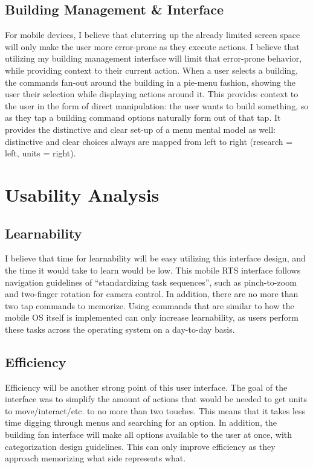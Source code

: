 \documentclass[11pt]{article}
\begin{document}
	\subsection{Building Management \& Interface}
	For mobile devices, I believe that cluterring up the already limited screen space will only make the user more error-prone as they execute actions. I believe that utilizing my building management interface will limit that error-prone behavior, while providing context to their current action. When a user selects a building, the commands fan-out around the building in a pie-menu fashion, showing the user their selection while displaying actions around it. This provides context to the user in the form of direct manipulation: the user wants to build something, so as they tap a building command options naturally form out of that tap. It provides the distinctive and clear set-up of a menu mental model as well: distinctive and clear choices always are mapped from left to right (research = left, units = right). 
\section{Usability Analysis}
	\subsection{Learnability}
	I believe that time for learnability will be easy utilizing this interface design, and the time it would take to learn would be low. This mobile RTS interface follows navigation guidelines of ``standardizing task sequences'', such as pinch-to-zoom and two-finger rotation for camera control. In addition, there are no more than two tap commands to memorize. Using commands that are similar to how the mobile OS itself is implemented can only increase learnability, as users perform these tasks across the operating system on a day-to-day basis.
	\subsection{Efficiency}
	Efficiency will be another strong point of this user interface. The goal of the interface was to simplify the amount of actions that would be needed to get units to move/interact/etc. to no more than two touches. This means that it takes less time digging through menus and searching for an option. In addition, the building fan interface will make all options available to the user at once, with categorization design guidelines. This can only improve efficiency as they approach memorizing what side represents what.
\end{document}
